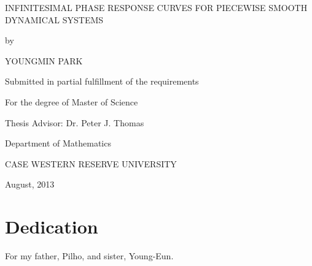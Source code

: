 \documentclass[12pt]{article}
\begin{document}
\pagestyle{empty}
\begin{titlepage}
\begin{center}
INFINITESIMAL PHASE RESPONSE CURVES FOR PIECEWISE SMOOTH DYNAMICAL SYSTEMS\end{center}
\vfill
\begin{center}
by
\end{center}
\begin{center}
YOUNGMIN PARK
\end{center}
\vfill
\begin{center}
Submitted in partial fulfillment of the requirements
\end{center}
\begin{center}
For the degree of Master of Science
\end{center}
\vfill
\begin{center}
Thesis Advisor:  Dr. Peter J. Thomas\\
\end{center}
\vfill
\begin{center}
Department of Mathematics\\ 
\end{center}
\begin{center}
CASE WESTERN RESERVE UNIVERSITY
\end{center}
\vfill
\begin{center}
August, 2013
\vfill
\end{center}
\end{titlepage}



\newpage

\section*{Dedication}
For my father, Pilho, and sister, Young-Eun.
\newpage

\pagestyle{plain}
\tableofcontents
\newpage

\listoftables
{}
\newpage

\listoffigures
{}
\newpage
\end{document}
